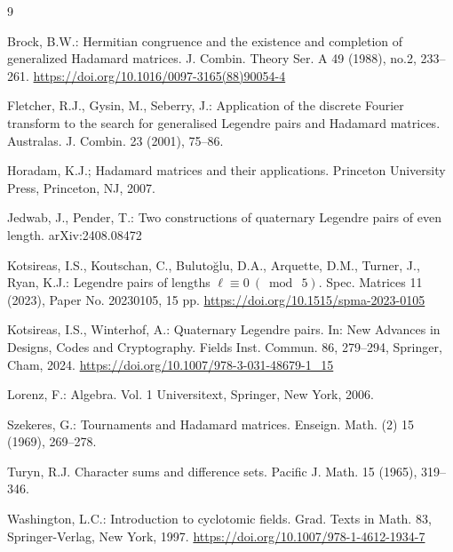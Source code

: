 \documentclass{article}
\theoremstyle{definition}
\newcommand{\aw}[1]{{\color{magenta} #1}}
\begin{document}
\begin{thebibliography}{9}

 Brock, B.W.: 
Hermitian congruence and the existence and completion of generalized Hadamard matrices.
J. Combin. Theory Ser. A 49 (1988), no.2, 233--261. 
\url{https://doi.org/10.1016/0097-3165(88)90054-4}


Fletcher, R.J., Gysin, M., Seberry, J.: Application of the discrete Fourier transform to the search for generalised Legendre pairs and Hadamard matrices.
Australas. J. Combin. 23 (2001), 75--86.

  Horadam, K.J.; Hadamard matrices and their applications.
Princeton University Press, Princeton, NJ, 2007.

 Jedwab, J., Pender, T.: Two constructions of quaternary Legendre pairs of even length. arXiv:2408.08472


 Kotsireas, I.S., Koutschan, C., Buluto\u glu, D.A., Arquette, D.M., Turner, J., Ryan, K.J.: Legendre pairs of lengths $\ell\equiv 0~(\bmod~5)$. Spec. Matrices 11 (2023), Paper No. 20230105, 15 pp.
\url{https://doi.org/10.1515/spma-2023-0105}

 Kotsireas, I.S., Winterhof, A.: Quaternary Legendre pairs. In: New Advances in Designs, Codes and Cryptography. Fields Inst. Commun. 86, 279--294, Springer, Cham, 2024. \url{https://doi.org/10.1007/978-3-031-48679-1_15}

 Lorenz, F.: Algebra. Vol. 1
Universitext,
Springer, New York, 2006.

 Szekeres, G.:
Tournaments and Hadamard matrices.
Enseign. Math. (2) 15 (1969), 269--278.

 Turyn, R.J.
Character sums and difference sets.
Pacific J. Math. 15 (1965), 319--346.

 Washington, L.C.: Introduction to cyclotomic fields.
Grad. Texts in Math. 83,
Springer-Verlag, New York, 1997.
\url{https://doi.org/10.1007/978-1-4612-1934-7}
\end{thebibliography}
\end{document}
